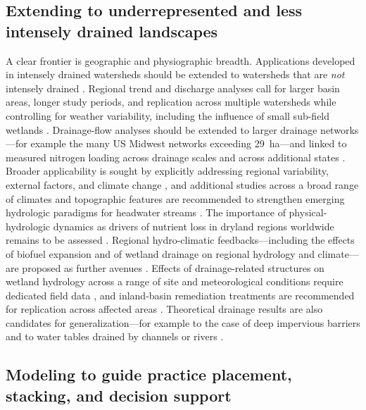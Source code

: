 \documentclass[11pt]{article}
\begin{document}
\subsection{Extending to underrepresented and less intensely drained landscapes}

A clear frontier is geographic and physiographic breadth. Applications developed in intensely drained watersheds should be extended to watersheds that are \emph{not} intensely drained \parencite{Kujawa2020}. Regional trend and discharge analyses call for larger basin areas, longer study periods, and replication across multiple watersheds while controlling for weather variability, including the influence of small sub-field wetlands \parencite{Yang2017}. Drainage-flow analyses should be extended to larger drainage networks---for example the many US Midwest networks exceeding 29~ha---and linked to measured nitrogen loading across drainage scales and across additional states \parencite{Christianson2025}. Broader applicability is sought by explicitly addressing regional variability, external factors, and climate change \parencite{Naderi2025}, and additional studies across a broad range of climates and topographic features are recommended to strengthen emerging hydrologic paradigms for headwater streams \parencite{King2009}. The importance of physical-hydrologic dynamics as drivers of nutrient loss in dryland regions worldwide remains to be assessed \parencite{Kelley2017}. Regional hydro-climatic feedbacks---including the effects of biofuel expansion and of wetland drainage on regional hydrology and climate---are proposed as further avenues \parencite{Kumar2009}. Effects of drainage-related structures on wetland hydrology across a range of site and meteorological conditions require dedicated field data \parencite{Tangen2018}, and inland-basin remediation treatments are recommended for replication across affected areas \parencite{Kumar2006}. Theoretical drainage results are also candidates for generalization---for example to the case of deep impervious barriers and to water tables drained by channels or rivers \parencite{Zimmer2023}.

\subsection{Modeling to guide practice placement, stacking, and decision support}
\end{document}
